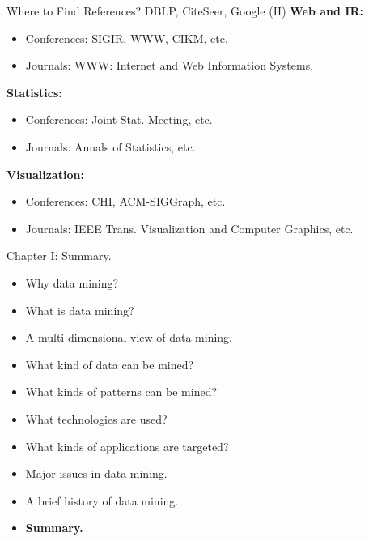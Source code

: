 \documentclass[aspectratio=169,t]{beamer}
\begin{document}
  {
    \begin{frame}{Where to Find References? DBLP, CiteSeer, Google (II)}
    \textbf{Web and IR:}
        \begin{itemize}
            \item Conferences: SIGIR, WWW, CIKM, etc.
            \item Journals: WWW: Internet and Web Information Systems.
        \end{itemize}
    \textbf{Statistics:}
        \begin{itemize}
            \item Conferences: Joint Stat. Meeting, etc.
            \item Journals: Annals of Statistics, etc.
        \end{itemize}
    \textbf{Visualization:}
        \begin{itemize}
            \item Conferences: CHI, ACM-SIGGraph, etc.
            \item Journals: IEEE Trans. Visualization and Computer Graphics, etc.
        \end{itemize}
    \end{frame}
  }

 { 
    \begin{frame}{Chapter I: Summary.}
        \begin{itemize}
            \item Why data mining?
            \item What is data mining?
            \item A multi-dimensional view of data mining.
            \item What kind of data can be mined?
            \item What kinds of patterns can be mined?
            \item What technologies are used?
            \item What kinds of applications are targeted?
            \item Major issues in data mining.
            \item A brief history of data mining.
            \item \textbf{Summary.}
        \end{itemize}
    \end{frame}
  }
\end{document}
